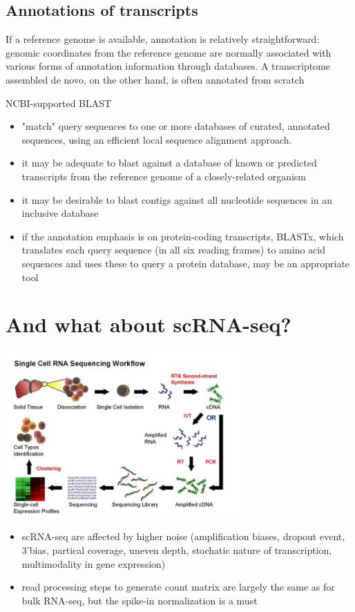 \documentclass{beamer}\usepackage[]{graphicx}\usepackage[]{color}
\begin{document}
\subsection{Annotations of transcripts}
\begin{frame}
\begin{displayquote}
\footnotesize
If a reference genome is available, annotation is relatively straightforward:  genomic coordinates from the reference genome are normally associated with various forms of annotation information through databases. A transcriptome assembled de novo, on the other hand, is often annotated from scratch
\end{displayquote}
\begin{block}{NCBI-supported BLAST}
\begin{itemize}
\footnotesize
  \item "match" query sequences to one or more databases of curated, annotated sequences, using an efficient local sequence alignment approach.
  \item it may be adequate to blast against a database of known or predicted transcripts from the reference genome of a closely-related organism
  \item it may be desirable to blast contigs against all nucleotide sequences in an inclusive database
  \item if the annotation emphasis is on protein-coding transcripts, BLASTx, which translates each query sequence (in all six reading frames) to amino acid sequences and uses these to query a protein database, may be an appropriate tool
\end{itemize}
\end{block}
\end{frame}

\section{And what about scRNA-seq?}
\begin{frame}
\centering
\includegraphics[width=9cm]{Images/scRNAseq_workflow.jpg}
\begin{itemize}
\footnotesize
  \item scRNA-seq are affected by higher noise (amplification biases, dropout event, 3'bias, partical coverage, uneven depth, stochatic nature of transcription, multimodality in gene expression)
  \item read processing steps to generate count matrix are largely the same as for bulk RNA-seq, but the spike-in normalization is a must 
\end{itemize}
\end{frame}
\end{document}
